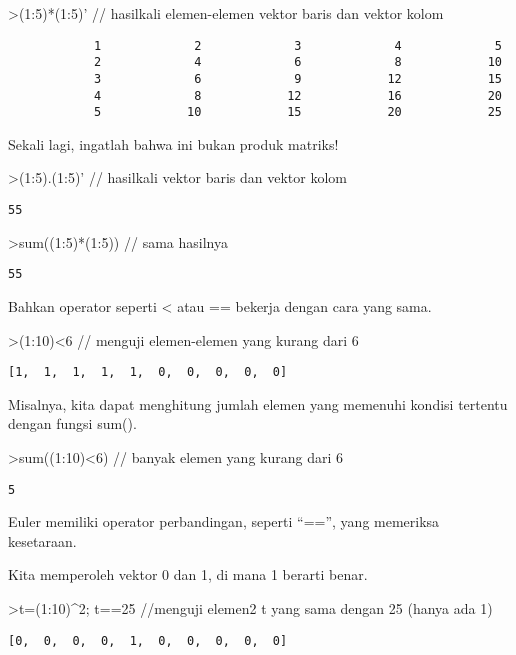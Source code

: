 \documentclass[
]{book}
\begin{document}
\textgreater(1:5)*(1:5)' // hasilkali elemen-elemen vektor baris dan vektor kolom

\begin{verbatim}
            1             2             3             4             5 
            2             4             6             8            10 
            3             6             9            12            15 
            4             8            12            16            20 
            5            10            15            20            25 
\end{verbatim}

Sekali lagi, ingatlah bahwa ini bukan produk matriks!

\textgreater(1:5).(1:5)' // hasilkali vektor baris dan vektor kolom

\begin{verbatim}
55
\end{verbatim}

\textgreater sum((1:5)*(1:5)) // sama hasilnya

\begin{verbatim}
55
\end{verbatim}

Bahkan operator seperti \textless{} atau == bekerja dengan cara yang sama.

\textgreater(1:10)\textless6 // menguji elemen-elemen yang kurang dari 6

\begin{verbatim}
[1,  1,  1,  1,  1,  0,  0,  0,  0,  0]
\end{verbatim}

Misalnya, kita dapat menghitung jumlah elemen yang memenuhi kondisi tertentu dengan fungsi sum().

\textgreater sum((1:10)\textless6) // banyak elemen yang kurang dari 6

\begin{verbatim}
5
\end{verbatim}

Euler memiliki operator perbandingan, seperti ``=='', yang memeriksa kesetaraan.

Kita memperoleh vektor 0 dan 1, di mana 1 berarti benar.

\textgreater t=(1:10)\^{}2; t==25 //menguji elemen2 t yang sama dengan 25 (hanya ada 1)

\begin{verbatim}
[0,  0,  0,  0,  1,  0,  0,  0,  0,  0]
\end{verbatim}
\end{document}
